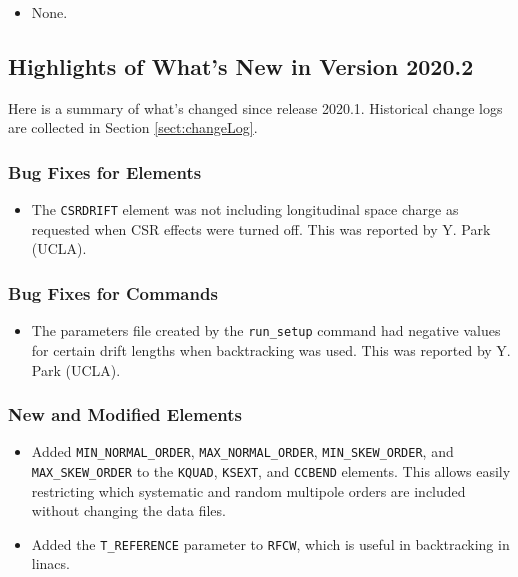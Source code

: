 \documentclass[11pt]{article}
\begin{document}
\begin{itemize}
\item None.
\end{itemize}

\subsection{Highlights of What's New in Version 2020.2}

Here is a summary of what's changed since release 2020.1.  Historical change logs are collected in Section
\ref{sect:changeLog}.

\subsubsection{Bug Fixes for Elements}

\begin{itemize}
\item The \verb|CSRDRIFT| element was not including longitudinal space charge as requested when CSR effects were turned
off.  This was reported by Y. Park (UCLA).
\end{itemize}

\subsubsection{Bug Fixes for Commands}
\begin{itemize}
\item The parameters file created by the \verb|run_setup| command had negative values for certain drift lengths when
backtracking was used.  This was reported by Y. Park (UCLA).
\end{itemize}

\subsubsection{New and Modified Elements}
\begin{itemize}
\item Added \verb|MIN_NORMAL_ORDER|, \verb|MAX_NORMAL_ORDER|, \verb|MIN_SKEW_ORDER|, and \verb|MAX_SKEW_ORDER| to the
\verb|KQUAD|, \verb|KSEXT|, and \verb|CCBEND| elements.  This allows easily restricting which systematic and random
multipole orders are included without changing the data files.
\item Added the \verb|T_REFERENCE| parameter to \verb|RFCW|, which is useful in backtracking in linacs.
\end{itemize}
\end{document}
